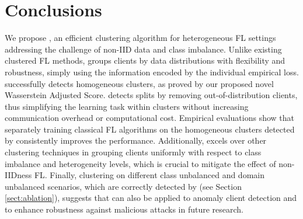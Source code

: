 \section{Conclusions}

We propose \shortname, an efficient clustering algorithm for heterogeneous FL settings addressing the challenge of non-IID data and class imbalance. Unlike existing clustered FL methods, \shortname groups clients by data distributions with flexibility and robustness, simply using the information encoded by the individual empirical loss. \shortname successfully detects homogeneous clusters, as proved by our proposed novel Wasserstein Adjusted Score. \shortname detects splits by removing out-of-distribution clients, thus simplifying the learning task within clusters without increasing communication overhead or computational cost. Empirical evaluations show that separately training classical FL algorithms on the homogeneous clusters detected by \shortname consistently improves the performance. Additionally, \shortname excels over other clustering techniques in grouping clients uniformly with respect to class imbalance and heterogeneity levels, which is crucial to mitigate the effect of non-IIDness  FL. Finally, clustering on different class unbalanced and domain unbalanced scenarios, which are correctly detected by \shortname (see Section \ref{sect:ablation}), suggests that \shortname can also be applied to anomaly client detection and to enhance robustness against malicious attacks in future research.
